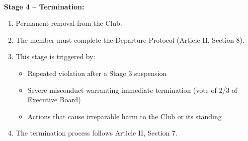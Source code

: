 \\
\textbf{Stage 4 -- Termination:}
\begin{enumerate}[label=\alph*), leftmargin=2em, itemsep=0.3em]
    \item Permanent removal from the Club.
    \item The member must complete the Departure Protocol (Article II, Section 8).
    \item This stage is triggered by:
    \begin{itemize}[leftmargin=1.5em, itemsep=0.2em]
        \item Repeated violation after a Stage 3 suspension
        \item Severe misconduct warranting immediate termination (vote of 2/3 of Executive Board)
        \item Actions that cause irreparable harm to the Club or its standing
    \end{itemize}
    \item The termination process follows Article II, Section 7.
\end{enumerate}


